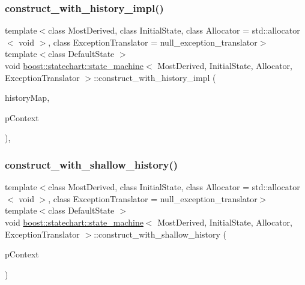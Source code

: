 \subsubsection{\texorpdfstring{construct\+\_\+with\+\_\+history\+\_\+impl()}{construct\_with\_history\_impl()}}
{\footnotesize\ttfamily template$<$class Most\+Derived, class Initial\+State, class Allocator = std\+::allocator$<$ void $>$, class Exception\+Translator = null\+\_\+exception\+\_\+translator$>$ \\
template$<$class Default\+State $>$ \\
void \mbox{\hyperlink{classboost_1_1statechart_1_1state__machine}{boost\+::statechart\+::state\+\_\+machine}}$<$ Most\+Derived, Initial\+State, Allocator, Exception\+Translator $>$\+::construct\+\_\+with\+\_\+history\+\_\+impl (\begin{DoxyParamCaption}\item[{\mbox{\hyperlink{classboost_1_1statechart_1_1state__machine_a9b8fdd7b5af3b0c9143f9d6fb4036ff7}{history\+\_\+map\+\_\+type}} \&}]{history\+Map,  }\item[{const typename Default\+State\+::context\+\_\+ptr\+\_\+type \&}]{p\+Context }\end{DoxyParamCaption})\hspace{0.3cm}{\ttfamily [inline]}, {\ttfamily [private]}}

\mbox{\label{classboost_1_1statechart_1_1state__machine_ab1ea201332087d93ce5483a413fc1e7f}} 
\subsubsection{\texorpdfstring{construct\+\_\+with\+\_\+shallow\+\_\+history()}{construct\_with\_shallow\_history()}}
{\footnotesize\ttfamily template$<$class Most\+Derived, class Initial\+State, class Allocator = std\+::allocator$<$ void $>$, class Exception\+Translator = null\+\_\+exception\+\_\+translator$>$ \\
template$<$class Default\+State $>$ \\
void \mbox{\hyperlink{classboost_1_1statechart_1_1state__machine}{boost\+::statechart\+::state\+\_\+machine}}$<$ Most\+Derived, Initial\+State, Allocator, Exception\+Translator $>$\+::construct\+\_\+with\+\_\+shallow\+\_\+history (\begin{DoxyParamCaption}\item[{const typename Default\+State\+::context\+\_\+ptr\+\_\+type \&}]{p\+Context }\end{DoxyParamCaption})\hspace{0.3cm}{\ttfamily [inline]}}

